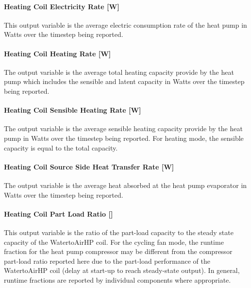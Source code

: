 \paragraph{Heating Coil Electricity Rate {[}W{]}}\label{heating-coil-electric-power-w-7}

This output variable is the average electric consumption rate of the heat pump in Watts over the timestep being reported.

\paragraph{Heating Coil Heating Rate {[}W{]}}\label{heating-coil-heating-rate-w-10}

The output variable is the average total heating capacity provide by the heat pump which includes the sensible and latent capacity in Watts over the timestep being reported.

\paragraph{Heating Coil Sensible Heating Rate {[}W{]}}\label{heating-coil-sensible-heating-rate-w-1}

The output variable is the average sensible heating capacity provide by the heat pump in Watts over the timestep being reported. For heating mode, the sensible capacity is equal to the total capacity.

\paragraph{Heating Coil Source Side Heat Transfer Rate {[}W{]}}\label{heating-coil-source-side-heat-transfer-rate-w-1}

The output variable is the average heat absorbed at the heat pump evaporator in Watts over the timestep being reported.

\paragraph{Heating Coil Part Load Ratio {[]}}\label{heating-coil-part-load-ratio-1}

This output variable is the ratio of the part-load capacity to the steady state capacity of the WatertoAirHP coil. For the cycling fan mode, the runtime fraction for the heat pump compressor may be different from the compressor part-load ratio reported here due to the part-load performance of the WatertoAirHP coil (delay at start-up to reach steady-state output). In general, runtime fractions are reported by individual components where appropriate.


